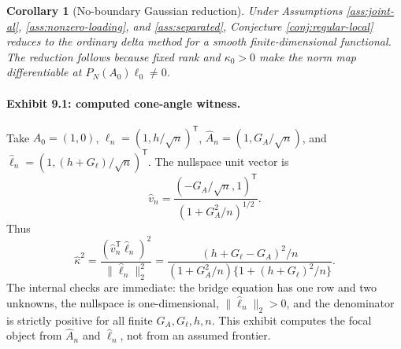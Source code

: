 \documentclass[11pt]{article}
\newcommand{\transpose}{\mathsf{T}}
\theoremstyle{definition}
\theoremstyle{plain}
\newtheorem{corollary}{Corollary}
\theoremstyle{remark}
\begin{document}
\begin{corollary}[No-boundary Gaussian reduction]
Under Assumptions \ref{ass:joint-al}, \ref{ass:nonzero-loading}, and \ref{ass:separated}, Conjecture \ref{conj:regular-local} reduces to the ordinary delta method for a smooth finite-dimensional functional. The reduction follows because fixed rank and \(\kappa_0>0\) make the norm map differentiable at \(P_N(A_0)\ell_0\ne0\).
\end{corollary}

\paragraph{Exhibit 9.1: computed cone-angle witness.}
Take \(A_0=(1,0)\), \(\ell_n=(1,h/\sqrt n)^\transpose\), \(\widehat A_n=(1,G_A/\sqrt n)\), and \(\widehat\ell_n=(1,(h+G_\ell)/\sqrt n)^\transpose\). The nullspace unit vector is
\[
        \widehat v_n=\frac{(-G_A/\sqrt n,1)^\transpose}{(1+G_A^2/n)^{1/2}} .
\]
Thus
\[
        \widehat\kappa^2
        =
        \frac{(\widehat v_n^\transpose\widehat\ell_n)^2}{\|\widehat\ell_n\|_2^2}
        =
        \frac{(h+G_\ell-G_A)^2/n}{(1+G_A^2/n)\{1+(h+G_\ell)^2/n\}} .
\]
The internal checks are immediate: the bridge equation has one row and two unknowns, the nullspace is one-dimensional, \(\|\widehat\ell_n\|_2>0\), and the denominator is strictly positive for all finite \(G_A,G_\ell,h,n\). This exhibit computes the focal object from \(\widehat A_n\) and \(\widehat\ell_n\), not from an assumed frontier.
\end{document}

